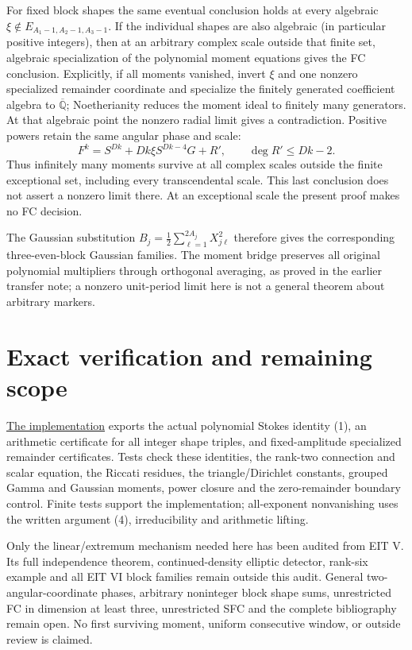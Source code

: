 \documentclass[11pt]{article}
\newcommand{\Qb}{\overline{\mathbb Q}}
\begin{document}
For fixed block shapes the same eventual conclusion holds at every
algebraic $\xi\notin E_{A_1-1,A_2-1,A_3-1}$. If the individual shapes are
also algebraic (in particular positive integers), then at an arbitrary
complex scale outside that finite set, algebraic specialization of the polynomial moment
equations gives the FC conclusion. Explicitly, if all moments vanished,
invert $\xi$ and one nonzero specialized remainder coordinate and specialize
the finitely generated coefficient algebra to $\Qb$; Noetherianity reduces
the moment ideal to finitely many generators. At that algebraic point the
nonzero radial limit gives a contradiction. Positive powers retain the
same angular phase and scale:
\[
 F^k=S^{Dk}+Dk\xi S^{Dk-4}G+R',\qquad \deg R'\le Dk-2.
\]
Thus infinitely many moments survive at all complex scales outside the
finite exceptional set, including every transcendental scale. This last
conclusion does not assert a nonzero limit there. At an exceptional scale
the present proof makes no FC decision.

The Gaussian substitution $B_j=\frac12\sum_{\ell=1}^{2A_j}X_{j\ell}^2$
therefore gives the corresponding three-even-block Gaussian families.
The moment bridge preserves all original polynomial multipliers through
orthogonal averaging, as proved in the earlier transfer note; a nonzero
unit-period limit here is not a general theorem about arbitrary markers.

\section{Exact verification and remaining scope}
\href{two_angular.py}{The implementation} exports the actual polynomial
Stokes identity (1), an arithmetic certificate for all integer shape
triples, and fixed-amplitude specialized remainder certificates. Tests
check these identities, the rank-two connection and scalar equation,
the Riccati residues, the triangle/Dirichlet constants, grouped Gamma and
Gaussian moments, power closure and the zero-remainder boundary control.
Finite tests support the implementation; all-exponent nonvanishing uses
the written argument (4), irreducibility and arithmetic lifting.

Only the linear/extremum mechanism needed here has been audited from
EIT V. Its full independence theorem, continued-density elliptic detector,
rank-six example and all EIT VI block families remain outside this audit.
General two-angular-coordinate phases, arbitrary noninteger block shape
sums, unrestricted FC in dimension at least three, unrestricted SFC and
the complete bibliography remain open. No first surviving moment,
uniform consecutive window, or outside review is claimed.
\end{document}
